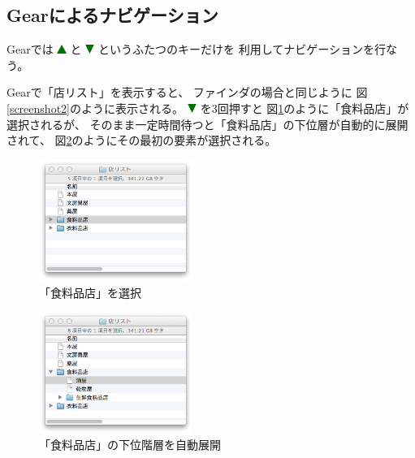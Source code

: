 \documentclass[twoside]{wiss}
\def\GEAR{\textsf{Gear}}
\def\figwidth{50mm}
\def\up{ \includegraphics[width=3mm,bb=0 0 36 36]{figures/uptriangle.pdf} }
\def\down{ \includegraphics[width=3mm,bb=0 0 36 36]{figures/downtriangle.pdf} }
\begin{document}
\subsection{{\GEAR}によるナビゲーション}

{\GEAR}では{\up}と{\down}というふたつのキーだけを
利用してナビゲーションを行なう。

{\GEAR}で「店リスト」を表示すると、
ファインダの場合と同じように
図\ref{screenshot2}のように表示される。
{\down}を3回押すと
図\ref{screenshot42}のように「食料品店」が選択されるが、
そのまま一定時間待つと「食料品店」の下位層が自動的に展開されて、
図\ref{screenshot7}のようにその最初の要素が選択される。

\begin{figure}[H]
\centerline{\includegraphics[width=\figwidth,bb=0 0 344 272]{figures/c074cd6daec3da0341125d1492b8a09c.png}}
\caption{「食料品店」を選択}
\label{screenshot42}
\end{figure}

\begin{figure}[H]
\centerline{\includegraphics[width=\figwidth,bb=0 0 344 272]{figures/2387e402f81dbe7917e04df82b0a659c.png}}
\caption{「食料品店」の下位階層を自動展開}
\label{screenshot7}
\end{figure}
\end{document}

